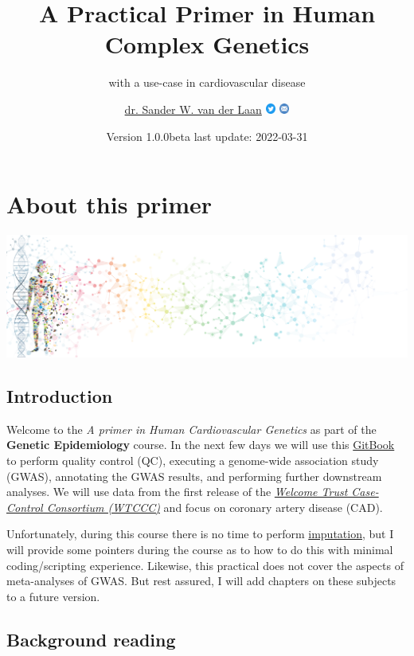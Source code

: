 \documentclass[
]{book}
\title{A Practical Primer in Human Complex Genetics}
\subtitle{with a use-case in cardiovascular disease}
\author{\href{https://swvanderlaan.github.iio}{dr. Sander W. van der Laan} \href{https://www.twitter.com/swvanderlaan}{\includegraphics[width=0.025\textwidth,height=\textheight]{img/twitter_circle_blue.png}} \href{mailto:s.w.vanderlaan@gmail.com}{\includegraphics[width=0.025\textwidth,height=\textheight]{img/email_circle_blue.png}}}
\date{Version 1.0.0beta \textbar{} last update: 2022-03-31}
\begin{document}
\maketitle

{
\setcounter{tocdepth}{1}
\tableofcontents
}
\hypertarget{about-this-primer}{%
\chapter{About this primer}\label{about-this-primer}}

\includegraphics{img/banner_man_standing_dna.png}

\hypertarget{introduction}{%
\section{Introduction}\label{introduction}}

Welcome to the \emph{A primer in Human Cardiovascular Genetics} as part of the \textbf{Genetic Epidemiology} course. In the next few days we will use this \href{https://cjvanlissa.github.io/gitbook-demo/}{GitBook} to perform quality control (QC), executing a genome-wide association study (GWAS), annotating the GWAS results, and performing further downstream analyses. We will use data from the first release of the \href{https://www.wtccc.org.uk/ccc1/overview.html}{\emph{Welcome Trust Case-Control Consortium (WTCCC)}} and focus on coronary artery disease (CAD).

Unfortunately, during this course there is no time to perform \href{https://www.nature.com/articles/nrg2796}{imputation}, but I will provide some pointers during the course as to how to do this with minimal coding/scripting experience. Likewise, this practical does not cover the aspects of meta-analyses of GWAS. But rest assured, I will add chapters on these subjects to a future version.

\hypertarget{background-reading}{%
\section{Background reading}\label{background-reading}}
\end{document}
